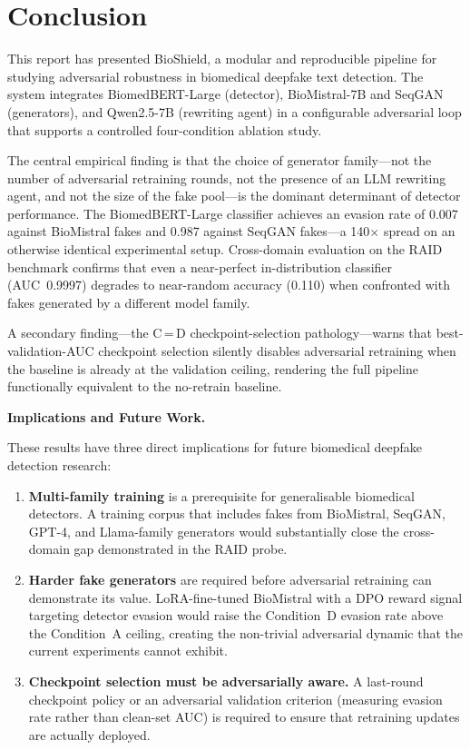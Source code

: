 \documentclass[12pt,a4paper]{article}
\begin{document}
\newpage
\section{Conclusion}
\label{sec:conclusion}

This report has presented BioShield, a modular and reproducible pipeline for
studying adversarial robustness in biomedical deepfake text detection. The
system integrates BiomedBERT-Large (detector), BioMistral-7B and SeqGAN
(generators), and Qwen2.5-7B (rewriting agent) in a configurable adversarial
loop that supports a controlled four-condition ablation study.

The central empirical finding is that the choice of generator family—not the
number of adversarial retraining rounds, not the presence of an LLM rewriting
agent, and not the size of the fake pool—is the dominant determinant of detector
performance. The BiomedBERT-Large classifier achieves an evasion rate of 0.007
against BioMistral fakes and 0.987 against SeqGAN fakes—a 140$\times$ spread
on an otherwise identical experimental setup. Cross-domain evaluation on the
RAID benchmark confirms that even a near-perfect in-distribution classifier
(AUC~0.9997) degrades to near-random accuracy (0.110) when confronted with
fakes generated by a different model family.

A secondary finding—the C\,=\,D checkpoint-selection pathology—warns that
best-validation-AUC checkpoint selection silently disables adversarial retraining
when the baseline is already at the validation ceiling, rendering the full
pipeline functionally equivalent to the no-retrain baseline.

\medskip
\noindent\textbf{Implications and Future Work.}

These results have three direct implications for future biomedical deepfake
detection research:

\begin{enumerate}
    \item \textbf{Multi-family training} is a prerequisite for generalisable
          biomedical detectors. A training corpus that includes fakes from
          BioMistral, SeqGAN, GPT-4, and Llama-family generators would
          substantially close the cross-domain gap demonstrated in the RAID
          probe.
    \item \textbf{Harder fake generators} are required before adversarial
          retraining can demonstrate its value. LoRA-fine-tuned BioMistral
          with a DPO reward signal targeting detector evasion would raise the
          Condition~D evasion rate above the Condition~A ceiling, creating the
          non-trivial adversarial dynamic that the current experiments cannot
          exhibit.
    \item \textbf{Checkpoint selection must be adversarially aware.} A
          last-round checkpoint policy or an adversarial validation criterion
          (measuring evasion rate rather than clean-set AUC) is required to
          ensure that retraining updates are actually deployed.
\end{enumerate}
\end{document}
